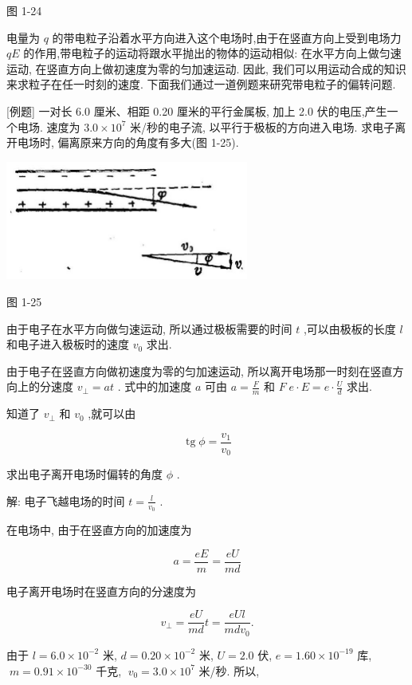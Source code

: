 \documentclass[10pt]{article}
\begin{document}
图 1-24

电量为 \(q\) 的带电粒子沿着水平方向进入这个电场时,由于在竖直方向上受到电场力 \({qE}\) 的作用,带电粒子的运动将跟水平抛出的物体的运动相似: 在水平方向上做匀速运动, 在竖直方向上做初速度为零的匀加速运动. 因此, 我们可以用运动合成的知识来求粒子在任一时刻的速度. 下面我们通过一道例题来研究带电粒子的偏转问题.

[例题] 一对长 6.0 厘米、相距 0.20 厘米的平行金属板, 加上 2.0 伏的电压,产生一个电场. 速度为 \({3.0} \times {10}^{7}\) 米/秒的电子流, 以平行于极板的方向进入电场. 求电子离开电场时, 偏离原来方向的角度有多大(图 1-25).

\begin{center}
\includegraphics[max width=0.6\textwidth]{images/01913056-1f15-74d8-9184-9aab52c9d66b_38_558921.jpg}
\end{center}

图 1-25

由于电子在水平方向做匀速运动, 所以通过极板需要的时间 \(t\) ,可以由极板的长度 \(l\) 和电子进入极板时的速度 \({v}_{0}\) 求出.

由于电子在竖直方向做初速度为零的匀加速运动, 所以离开电场那一时刻在竖直方向上的分速度 \({v}_{ \bot } = {at}\) . 式中的加速度 \(a\) 可由 \(a = \frac{F}{m}\) 和 \(F\;e \cdot E = e \cdot \frac{U}{d}\) 求出.

知道了 \({v}_{ \bot }\) 和 \({v}_{0}\) ,就可以由

\[
\operatorname{tg}\phi = \frac{{v}_{1}}{{v}_{0}}
\]

求出电子离开电场时偏转的角度 \(\phi\) .

解: 电子飞越电场的时间 \(t = \frac{l}{{v}_{0}}\) .

在电场中, 由于在竖直方向的加速度为

\[
a = \frac{eE}{m} = \frac{eU}{md}
\]

电子离开电场时在竖直方向的分速度为

\[
{v}_{ \bot } = \frac{eU}{md}t = \frac{eUl}{{md}{v}_{0}}.
\]

由于 \(l = {6.0} \times {10}^{-2}\) 米, \(d = {0.20} \times {10}^{-2}\) 米, \(U = {2.0}\) 伏, \(e = {1.60} \times {10}^{-{19}}\) 库, \(\;m = {0.91} \times {10}^{-{30}}\) 千克, \(\;{v}_{0} = {3.0} \times {10}^{7}\) 米/秒. 所以,
\end{document}

